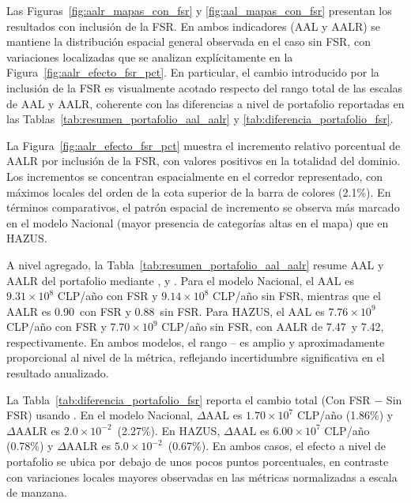 Las Figuras~\ref{fig:aalr_mapas_con_fsr} y \ref{fig:aal_mapas_con_fsr} presentan los resultados con inclusión de la FSR. En ambos indicadores (AAL y AALR) se mantiene la distribución espacial general observada en el caso sin FSR, con variaciones localizadas que se analizan explícitamente en la Figura~\ref{fig:aalr_efecto_fsr_pct}. En particular, el cambio introducido por la inclusión de la FSR es visualmente acotado respecto del rango total de las escalas de AAL y AALR, coherente con las diferencias a nivel de portafolio reportadas en las Tablas~\ref{tab:resumen_portafolio_aal_aalr} y \ref{tab:diferencia_portafolio_fsr}.

La Figura~\ref{fig:aalr_efecto_fsr_pct} muestra el incremento relativo porcentual de AALR por inclusión de la FSR, con valores positivos en la totalidad del dominio. Los incrementos se concentran espacialmente en el corredor representado, con máximos locales del orden de la cota superior de la barra de colores (2.1\%). En términos comparativos, el patrón espacial de incremento se observa más marcado en el modelo Nacional (mayor presencia de categorías altas en el mapa) que en HAZUS.


A nivel agregado, la Tabla~\ref{tab:resumen_portafolio_aal_aalr} resume AAL y AALR del portafolio mediante \pSixteen{}, \pFifty{} y \pEightyFour{}. Para el modelo Nacional, el AAL \pFifty{} es $9.31\times10^{8}$ CLP/año con FSR y $9.14\times10^{8}$ CLP/año sin FSR, mientras que el AALR \pFifty{} es 0.90\textperthousand\ con FSR y 0.88\textperthousand\ sin FSR. Para HAZUS, el AAL \pFifty{} es $7.76\times10^{9}$ CLP/año con FSR y $7.70\times10^{9}$ CLP/año sin FSR, con AALR \pFifty{} de 7.47\textperthousand\ y 7.42\textperthousand, respectivamente. En ambos modelos, el rango \pSixteen{}--\pEightyFour{} es amplio y aproximadamente proporcional al nivel de la métrica, reflejando incertidumbre significativa en el resultado anualizado.

La Tabla~\ref{tab:diferencia_portafolio_fsr} reporta el cambio total (Con FSR $-$ Sin FSR) usando \pFifty{}. En el modelo Nacional, $\Delta$AAL es $1.70\times10^{7}$ CLP/año (1.86\%) y $\Delta$AALR es $2.0\times10^{-2}$\textperthousand\ (2.27\%). En HAZUS, $\Delta$AAL es $6.00\times10^{7}$ CLP/año (0.78\%) y $\Delta$AALR es $5.0\times10^{-2}$\textperthousand\ (0.67\%). En ambos casos, el efecto a nivel de portafolio se ubica por debajo de unos pocos puntos porcentuales, en contraste con variaciones locales mayores observadas en las métricas normalizadas a escala de manzana.

